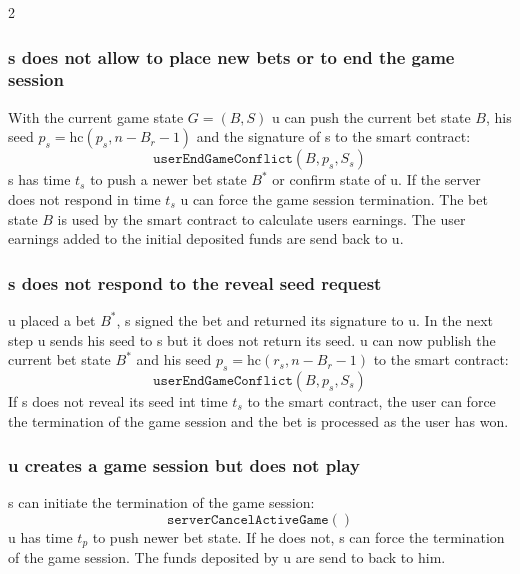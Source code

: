 \documentclass[oneside]{amsart}
\begin{document}
\begin{multicols}{2}
\subsubsection{\Gls{s} does not allow to place new bets or to end the game session}
With the current game state $G = (B,S)$ \Gls{u} can push the current bet state $B$, his seed
$p_s=\text{hc}(p_s, n - B_r - 1)$ and the signature of \gls{s} to the smart contract:
\begin{equation}
    \texttt{userEndGameConflict}(B, p_s, S_s)
\end{equation}
\Gls{s} has time $t_s$ to push a newer bet state $B^*$ or confirm state of \gls{u}.
If the server does not respond in time $t_s$ \gls{u} can force the game session termination.
The bet state $B$ is used by the smart contract to calculate users earnings.
The user earnings added to the initial deposited funds are send back to \gls{u}. %

\subsubsection{\Gls{s} does not respond to the reveal seed request}\label{subsubsec:serverNotRevealingSeed}
\Gls{u} placed a bet $B^*$, \gls{s} signed the bet and returned its signature to \gls{u}.
In the next step \gls{u} sends his seed to \gls{s} but it does not return its seed.
\Gls{u} can now publish the current bet state $B^*$ and his seed
$p_s=\text{hc}(r_s, n - B_r - 1)$ to the smart contract:
\begin{equation}
    \texttt{userEndGameConflict}(B, p_s, S_s)
\end{equation}
If \gls{s} does not reveal its seed int time $t_s$ to the smart contract, the user can
force the termination of the game session and the bet is processed as the user has won.


\subsubsection{\Gls{u} creates a game session but does not play}\label{subsubsec:userStopsPlaying}
\Gls{s} can initiate the termination of the game session:
\begin{equation}
    \texttt{serverCancelActiveGame}()
\end{equation}
\Gls{u} has time $t_p$ to push newer bet state.
If he does not, \gls{s} can force the termination of the game session.
The funds deposited by \gls{u} are send to back to him.


\end{multicols}
\end{document}
